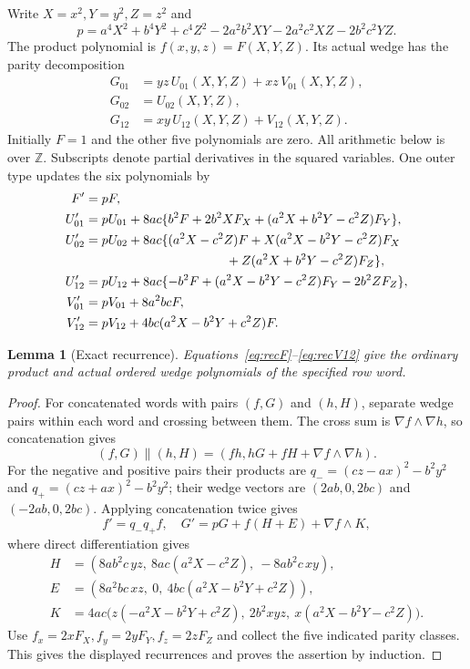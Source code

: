 \documentclass[11pt]{article}
\newtheorem{lemma}[theorem]{Lemma}
\theoremstyle{remark}\newtheorem{remark}[theorem]{Remark}
\newcommand{\Z}{\mathbb Z}
\begin{document}
Write $X=x^2,Y=y^2,Z=z^2$ and
\begin{equation}\label{eq:orbitfactor}
 p=a^4X^2+b^4Y^2+c^4Z^2
       -2a^2b^2XY-2a^2c^2XZ-2b^2c^2YZ.
\end{equation}
The product polynomial is $f(x,y,z)=F(X,Y,Z)$. Its actual wedge has
the parity decomposition
\begin{align*}
 G_{01}&=yz\,U_{01}(X,Y,Z)+xz\,V_{01}(X,Y,Z),\\
 G_{02}&=U_{02}(X,Y,Z),\\
 G_{12}&=xy\,U_{12}(X,Y,Z)+V_{12}(X,Y,Z).
\end{align*}
Initially $F=1$ and the other five polynomials are zero. All arithmetic
below is over $\Z$. Subscripts denote partial derivatives in the
squared variables. One outer type updates the six polynomials by
\begin{align}
 F'&=pF,\label{eq:recF}\\
 U'_{01}&=pU_{01}+8ac\{b^2F+2b^2XF_X
                  +(a^2X+b^2Y-c^2Z)F_Y\},\label{eq:rec01}\\
 U'_{02}&=pU_{02}+8ac\{(a^2X-c^2Z)F
          +X(a^2X-b^2Y-c^2Z)F_X\notag\\
        &\hspace{39mm}+Z(a^2X+b^2Y-c^2Z)F_Z\},\label{eq:rec02}\\
 U'_{12}&=pU_{12}+8ac\{-b^2F
                 +(a^2X-b^2Y-c^2Z)F_Y-2b^2ZF_Z\},\label{eq:rec12}\\
 V'_{01}&=pV_{01}+8a^2bcF,\label{eq:recV01}\\
 V'_{12}&=pV_{12}+4bc(a^2X-b^2Y+c^2Z)F.\label{eq:recV12}
\end{align}

\begin{lemma}[Exact recurrence]\label{lem:recurrence}
Equations~\eqref{eq:recF}--\eqref{eq:recV12} give the ordinary product
and actual ordered wedge polynomials of the specified row word.
\end{lemma}
\begin{proof}
For concatenated words with pairs $(f,G)$ and $(h,H)$, separate wedge
pairs within each word and crossing between them. The cross sum is
$\nabla f\wedge\nabla h$, so concatenation gives
\[
 (f,G)\mathbin{\|}(h,H)=(fh,hG+fH+\nabla f\wedge\nabla h).
\]
For the negative and positive pairs their products are
$q_-=(cz-ax)^2-b^2y^2$ and $q_+=(cz+ax)^2-b^2y^2$;
their wedge vectors are $(2ab,0,2bc)$ and $(-2ab,0,2bc)$.
Applying concatenation twice gives
\[
 f'=q_-q_+f,
 \quad G'=pG+f(H+E)+\nabla f\wedge K,
\]
where direct differentiation gives
\begin{align*}
 H&=(8ab^2c\,yz,\ 8ac(a^2X-c^2Z),\ -8ab^2c\,xy),\\
 E&=(8a^2bc\,xz,\ 0,\ 4bc(a^2X-b^2Y+c^2Z)),\\
 K&=4ac\bigl(z(-a^2X-b^2Y+c^2Z),\ 2b^2xyz,\
                    x(a^2X-b^2Y-c^2Z)\bigr).
\end{align*}
Use $f_x=2xF_X,f_y=2yF_Y,f_z=2zF_Z$ and collect the five
indicated parity classes. This gives the displayed recurrences and
proves the assertion by induction.
\end{proof}
\end{document}
